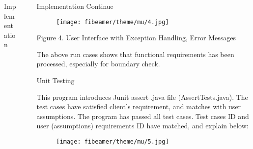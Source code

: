 \documentclass[final]{beamer}
\newlength{\sepwid}
\newlength{\onecolwid}
\newlength{\twocolwid}
\begin{document}
\begin{frame}
\begin{columns}[t]
\begin{column}{\twocolwid}
\begin{columns}[t,totalwidth=\twocolwid]
\begin{column}{\onecolwid}
\begin{exampleblock}{ {Implementation}}
\begin{itemize}
{}
  \end{itemize}
  
 

\end{exampleblock}

\end{column} %
\begin{column}{\sepwid}\end{column} %

\begin{column}{\onecolwid}\vspace{-.74in} %


\begin{exampleblock}{Implementation Continue}


  \begin{figure}
\texttt{[image: fibeamer/theme/mu/4.jpg]}
\end{figure}
          
            Figure 4. User Interface with Exception Handling, Error Messages    
             



  
 \begin{itemize}
           {\small              
\item The above run cases shows that functional requirements has been processed, especially for boundary check.

}
 \end{itemize}
\end{exampleblock}


\begin{exampleblock}{Unit Testing}
  \begin{itemize}
              
        {\small      \item  This program introduces Junit assert .java file (AssertTests.java). The test cases have satisfied client's requirement, and matches with user assumptions. The program has passed all test cases. 
Test cases ID and user (assumptions) requirements ID have matched, and explain below:
}
 
  \begin{figure}
\texttt{[image: fibeamer/theme/mu/5.jpg]}
\end{figure}


\end{itemize}
\end{exampleblock}
\end{column}
\end{columns}
\end{column}
\end{columns}
\end{frame}
\end{document}
